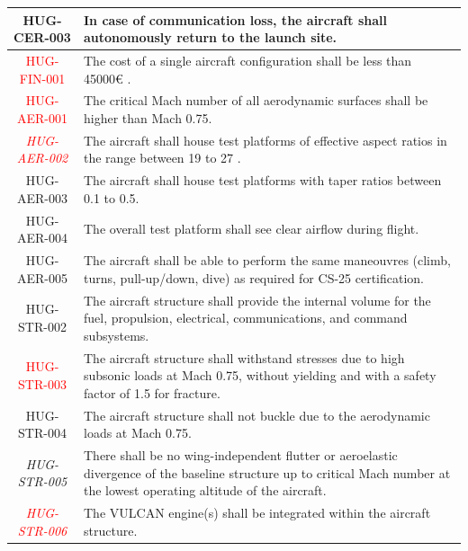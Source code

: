 \begin{longtable}{|c|p{13cm}|}
HUG-CER-003 & In case of communication loss, the aircraft shall autonomously return to the launch site. \\ \hline

\textcolor{red}{HUG-FIN-001} & The cost of a single aircraft configuration shall be less than 45000€ \cite{Castro2026}.\\ \hline

\textcolor{red}{HUG-AER-001}& The critical Mach number of all aerodynamic surfaces shall be higher than Mach 0.75.\\ \hline 

\textcolor{red}{\textit{HUG-AER-002}}& The aircraft shall house test platforms of effective aspect ratios in the range between 19 to 27 \cite{Aerodynamic_Analysis}.\\ \hline

HUG-AER-003& The aircraft shall house test platforms with taper ratios between 0.1 to 0.5.\\ \hline 

HUG-AER-004& The overall test platform shall see clear airflow during flight.\\ \hline 

HUG-AER-005& The aircraft shall be able to perform the same maneouvres (climb, turns, pull-up/down, dive) as required for CS-25 certification.\\ \hline 

HUG-STR-002 & The aircraft structure shall provide the internal volume for the fuel, propulsion, electrical, communications, and command subsystems.\\ \hline

\textcolor{red}{HUG-STR-003}& The aircraft structure shall withstand stresses due to high subsonic loads at Mach 0.75, without yielding and with a safety factor of 1.5 for fracture.\\ \hline 

HUG-STR-004& The aircraft structure shall not buckle due to the aerodynamic loads at Mach 0.75.\\ \hline 

\textit{HUG-STR-005}& There shall be no wing-independent flutter or aeroelastic divergence of the baseline structure up to critical Mach number at the lowest operating altitude of the aircraft.\\ \hline 

\textit{\textcolor{red}{HUG-STR-006}}& The VULCAN engine(s) shall be integrated within the aircraft structure. \\ \hline


\end{longtable}
